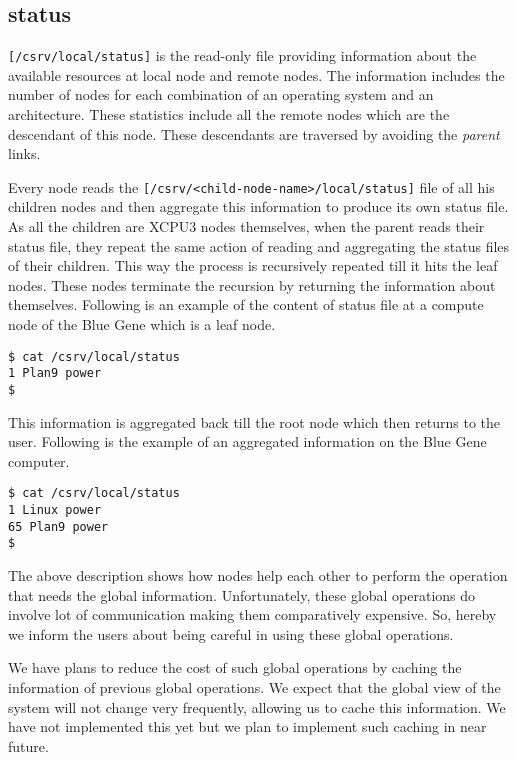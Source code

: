 \subsection{status} 
\texttt{[/csrv/local/status]} is the read-only file providing information about
the available resources at local node and remote nodes.  The information includes
the number of nodes for each combination of an operating system and an architecture.  These
statistics include all the remote nodes which are the descendant of this node. These
descendants are traversed by avoiding the \textit{parent} links.

Every node reads the \texttt{[/csrv/<child-node-name>/local/status]} file of all his children nodes and then
aggregate this information to produce its own status file.  As all the children are XCPU3
nodes themselves, when the parent reads their status file, they repeat the same action
of reading and aggregating the status files of their children.  This way the
process is recursively repeated till it hits the leaf nodes.  These nodes terminate
the recursion by returning the information about themselves. 
Following is an example of the content of status file at a compute node of the Blue Gene
which is a leaf node.
\begin{verbatim}
$ cat /csrv/local/status
1 Plan9 power
$ 
\end{verbatim}

This information is aggregated back till the root node which then returns to the user.
Following is the example of an aggregated information on the Blue Gene computer.
\begin{verbatim}
$ cat /csrv/local/status
1 Linux power
65 Plan9 power
$ 
\end{verbatim}

The above description shows how nodes help each other to perform the operation that needs
the global information.  Unfortunately, these global operations do involve lot of 
communication making them comparatively expensive.  So, hereby we inform the
users about being careful in using these global operations.

We have plans to reduce the cost of such global operations by caching the information 
of previous global operations.  We expect that the global view of the system will
not change very frequently, allowing us to cache this information.  We have not
implemented this yet but we plan to implement such caching in near future.


